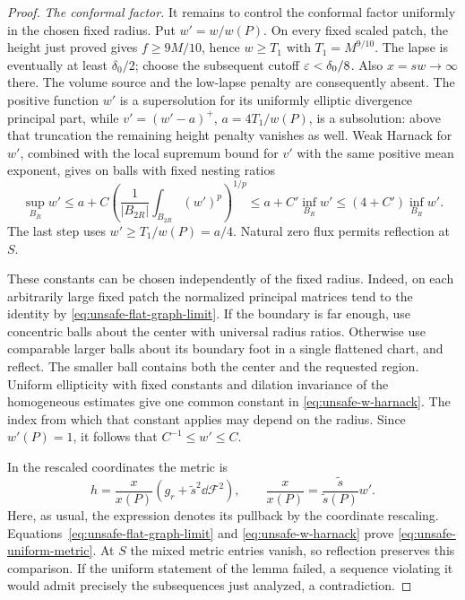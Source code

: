 \begin{proof}
\smallskip\noindent\emph{The conformal factor.}
It remains to control the conformal factor uniformly in the chosen
fixed radius.  Put \(w'=w/w(P)\).  On every fixed scaled patch,
the height just proved gives \(f\ge9M/10\), hence \(w\ge T_1\)
with \(T_1=M^{9/10}\).  The lapse is eventually at least
\(\delta_0/2\); choose the subsequent cutoff
\(\varepsilon<\delta_0/8\).  Also
\(x=sw\to\infty\) there.  The volume source and the low-lapse
penalty are consequently absent.  The positive function \(w'\)
is a supersolution for its uniformly elliptic divergence principal
part, while
\(v'=(w'-a)^+\), \(a=4T_1/w(P)\), is a subsolution: above
that truncation the remaining height penalty vanishes as well.
Weak Harnack for \(w'\), combined with the local supremum bound
for \(v'\) with the same positive mean exponent, gives on balls
with fixed nesting ratios
\begin{equation}
 \sup_{B_R}w'
 \le a+C\left(\frac1{|B_{2R}|}\int_{B_{2R}}(w')^p\right)^{1/p}
 \le a+C'\inf_{B_R}w'\le(4+C')\inf_{B_R}w'.
 \label{eq:unsafe-w-harnack}
\end{equation}
The last step uses \(w'\ge T_1/w(P)=a/4\).  Natural zero flux
permits reflection at \(S\).

These constants can be chosen independently of the fixed radius.
Indeed, on each arbitrarily large fixed patch the normalized
principal matrices tend to the identity by
\eqref{eq:unsafe-flat-graph-limit}.  If the boundary is far enough,
use concentric balls about the center with universal radius ratios.
Otherwise use comparable larger balls about its boundary foot in a
single flattened chart, and reflect.  The smaller ball contains both
the center and the requested region.  Uniform ellipticity with fixed
constants and dilation invariance of the homogeneous estimates give
one common constant in \eqref{eq:unsafe-w-harnack}.  The index from
which that constant applies may depend on the radius.  Since
\(w'(P)=1\), it follows that \(C^{-1}\le w'\le C\).

In the rescaled coordinates the metric is
\begin{equation}
 h=\frac{x}{x(P)}
       \left(g_r+\widetilde s^2\dd\mathcal F^2\right),
 \qquad
 \frac{x}{x(P)}=\frac{\widetilde s}{\widetilde s(P)}w'.
 \label{eq:unsafe-rescaled-metric}
\end{equation}
Here, as usual, the expression denotes its pullback by the coordinate
rescaling.  Equations~\eqref{eq:unsafe-flat-graph-limit} and
\eqref{eq:unsafe-w-harnack} prove
\eqref{eq:unsafe-uniform-metric}.  At \(S\) the mixed metric
entries vanish, so reflection preserves this comparison.  If the
uniform statement of the lemma failed, a sequence violating it would
admit precisely the subsequences just analyzed, a contradiction.
\end{proof}

